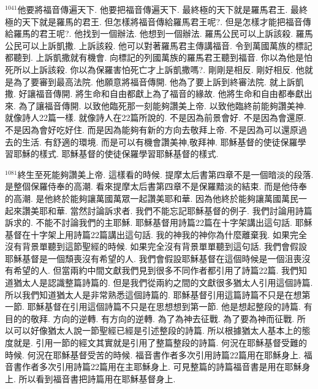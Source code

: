 \documentclass{book}
\begin{document}
$^{1041}$他要將福音傳遍天下.
他要把福音傳遍天下.
最終極的天下就是羅馬君王.
最終極的天下就是羅馬的君王.
但怎樣將福音傳給羅馬君王呢?.
但是怎樣才能把福音傳給羅馬的君王呢?.
他找到一個辦法.
他想到一個辦法.
羅馬公民可以上訴該殺.
羅馬公民可以上訴凱撒.
上訴該殺.
他可以對著羅馬君主傳講福音.
令到萬國萬族的標記都聽到.
上訴凱撒就有機會.
向標記的列國萬族的羅馬君王聽到福音.
你以為他是怕死所以上訴該殺.
你以為保羅害怕死亡才上訴凱撒嗎?.
剛剛是相反.
剛好相反.
他就是為了要審到最高法院.
他願意將福音傳開.
他為了要上訴到終審法院.
就上訴凱撒.
好讓福音傳開.
將生命和自由都獻上為了福音的緣故.
他將生命和自由都奉獻出來.
為了讓福音傳開.
以致他臨死那一刻能夠讚美上帝.
以致他臨終前能夠讚美神.
就像詩人22篇一樣.
就像詩人在22篇所說的.
不是因為前景會好.
不是因為會還原.
不是因為會好吃好住.
而是因為能夠有新的方向去敬拜上帝.
不是因為可以還原過去的生活.
有舒適的環境.
而是可以有機會讚美神,敬拜神.
耶穌基督的使徒保羅學習耶穌的樣式.
耶穌基督的使徒保羅學習耶穌基督的樣式.

$^{1081}$終生至死能夠讚美上帝.
這樣看的時候.
提摩太后書第四章不是一個暗淡的段落.
是整個保羅侍奉的高潮.
看來提摩太后書第四章不是保羅黯淡的結束.
而是他侍奉的高潮.
是他終於能夠讓萬國萬眾一起讚美耶和華.
因為他終於能夠讓萬國萬民一起來讚美耶和華.
當然討論訴求者.
我們不能忘記耶穌基督的例子.
我們討論用詩篇訴求的.
不能不討論我們的主耶穌.
耶穌基督用詩篇22篇在十字架講出這句話.
耶穌基督在十字架上用詩篇22篇講出這句話.
我的神我的神你為什麼離棄我.
如果完全沒有背景單聽到這節聖經的時候.
如果完全沒有背景單單聽到這句話.
我們會假設耶穌基督是一個頹喪沒有希望的人.
我們會假設耶穌基督在這個時候是一個沮喪沒有希望的人.
但當兩約中間文獻我們見到很多不同作者都引用了詩篇22篇.
我們知道猶太人是認識整篇詩篇的.
但是我們從兩約之間的文獻很多猶太人引用這個詩篇.
所以我們知道猶太人是非常熟悉這個詩篇的.
耶穌基督引用這篇詩篇不只是在想第一節.
耶穌基督在引用這個詩篇不只是在思想想到第一節.
他是想起整段的詩篇.
有目的的敬拜.
方向的逆轉.
有方向的逆轉.
為了為神去征戰.
為了要為神而征戰.
所以可以好像猶太人說一節聖經已經是引述整段的詩篇.
所以根據猶太人基本上的態度就是.
引用一節的經文其實就是引用了整篇整段的詩篇.
何況在耶穌基督受難的時候.
何況在耶穌基督受苦的時候.
福音書作者多次引用詩篇22篇用在耶穌身上.
福音書作者多次引用詩篇22篇用在主耶穌身上.
可見整篇的詩篇福音書是用在耶穌身上.
所以看到福音書把詩篇用在耶穌基督身上.
\end{document}
